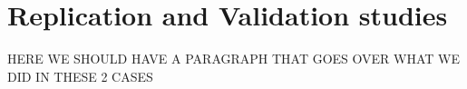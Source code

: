 
\chapter{Replication and Validation studies}

HERE WE SHOULD HAVE A PARAGRAPH THAT GOES OVER WHAT WE DID IN THESE 2 CASES